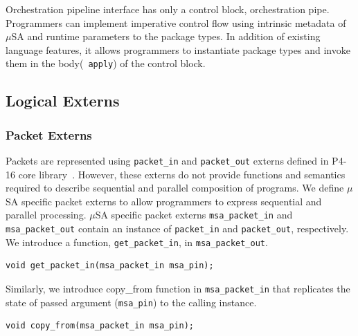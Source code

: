 \documentclass[10pt,sigconf,letterpaper,anonymous]{acmart}
\begin{document}
Orchestration pipeline interface has only a control block, orchestration pipe.
Programmers can implement imperative control flow using intrinsic metadata of $\mu$SA and runtime parameters to the package types.
In addition of existing language features, it allows programmers to instantiate package types and invoke them in the body(~\texttt{apply}) of the control block.



% 
% 
% 


\subsection{Logical Externs}
\label{subsection-logical-externs}
\subsubsection{Packet Externs}
Packets are represented using \texttt{packet\-\_in} and \texttt{packet\_out} externs defined in P4-16 core library~\cite{core.p4}.
However, these externs do not provide functions and semantics required to describe sequential and parallel composition of programs.
We define $\mu$SA specific packet externs to allow programmers to express sequential and parallel processing. 
$\mu$SA specific packet externs \texttt{msa\_packet\_in} and \texttt{msa\_packet\_out} contain an instance of \texttt{packet\_in} and \texttt{packet\_out}, respectively.
We introduce a function, \texttt{get\-\_packet\-\_in}, in \texttt{msa\-\_packet\-\_out}.
\begin{lstlisting}[frame=none]
void get_packet_in(msa_packet_in msa_pin);
\end{lstlisting}
Similarly, we introduce copy\_from function in \texttt{msa\_packet\_in} that replicates the state of passed argument (\texttt{msa\_pin}) to the calling instance.
\begin{lstlisting}[frame=none]
void copy_from(msa_packet_in msa_pin);
\end{lstlisting}
\end{document}
